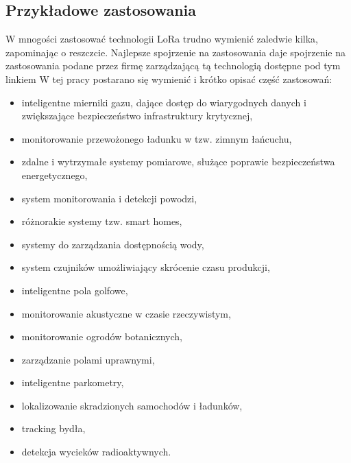 \subsection{Przykładowe zastosowania}
W mnogości zastosować technologii LoRa trudno wymienić zaledwie kilka, zapominając o reszczcie. Najlepsze spojrzenie na zastosowania daje spojrzenie na zastosowania podane przez firmę zarządzającą tą technologią dostępne pod tym linkiem\cite{loraapp}
W tej pracy postarano się wymienić i krótko opisać część zastosowań:
\begin{itemize}
	\item inteligentne mierniki gazu, dające dostęp do wiarygodnych danych i zwiększające bezpieczeństwo infrastruktury krytycznej,
	\item monitorowanie przewożonego ładunku w tzw. zimnym łańcuchu,
	\item zdalne i wytrzymałe systemy pomiarowe, służące poprawie bezpieczeństwa energetycznego,
	\item system monitorowania i detekcji powodzi,
	\item różnorakie systemy tzw. smart homes,
	\item systemy do zarządzania dostępnością wody,
	\item system czujników umożliwiający skrócenie czasu produkcji,
	\item inteligentne pola golfowe,
	\item monitorowanie akustyczne w czasie rzeczywistym,
	\item monitorowanie ogrodów botanicznych,
	\item zarządzanie polami uprawnymi,
	\item inteligentne parkometry,
	\item lokalizowanie skradzionych samochodów i ładunków,
	\item tracking bydła,
	\item detekcja wycieków radioaktywnych.
\end{itemize}
